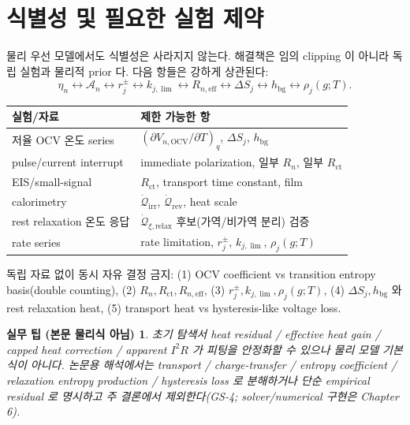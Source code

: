 \documentclass[11pt,a4paper]{article}
\newtheorem*{practicebox}{실무 팁 (본문 물리식 아님)}
\newcommand{\eff}{\mathrm{eff}}
\newcommand{\bg}{\mathrm{bg}}
\newcommand{\OCV}{\mathrm{OCV}}
\newcommand{\irr}{\mathrm{irr}}
\newcommand{\rev}{\mathrm{rev}}
\newcommand{\ct}{\mathrm{ct}}
\newcommand{\rlx}{\mathrm{relax}}
\begin{document}
\section{식별성 및 필요한 실험 제약}\label{sec:ch4_ident}
물리 우선 모델에서도 식별성은 사라지지 않는다. 해결책은 임의 clipping 이 아니라 독립 실험과 물리적 prior 다.
다음 항들은 강하게 상관된다:
\begin{equation}
\eta_n\leftrightarrow\mathcal A_n\leftrightarrow r_j^\pm\leftrightarrow k_{j,\lim}\leftrightarrow R_{n,\eff}\leftrightarrow\Delta S_j\leftrightarrow h_\bg\leftrightarrow\rho_j(g;T).
\label{eq:ch4_ident}
\end{equation}
\begin{longtable}{p{} >{\raggedright\arraybackslash}p{}}
\toprule 실험/자료 & 제한 가능한 항 \\ \midrule \endhead
저율 OCV 온도 series & $(\partial V_{n,\OCV}/\partial T)_q$, $\Delta S_j$, $h_\bg$ \\
pulse/current interrupt & immediate polarization, 일부 $R_n$, 일부 $R_\ct$ \\
EIS/small-signal & $R_\ct$, transport time constant, film \\
calorimetry & $\dot{\mathcal Q}_{\irr}$, $\dot{\mathcal Q}_{\rev}$, heat scale \\
rest relaxation 온도 응답 & $\dot{\mathcal Q}_{\xi,\rlx}$ 후보(가역/비가역 분리) 검증 \\
rate series & rate limitation, $r_j^\pm$, $k_{j,\lim}$, $\rho_j(g;T)$ \\
\bottomrule
\end{longtable}
독립 자료 없이 동시 자유 결정 금지: (1) OCV coefficient vs transition entropy basis(double counting),
(2) $R_n,R_\ct,R_{n,\eff}$, (3) $r_j^\pm,k_{j,\lim},\rho_j(g;T)$, (4) $\Delta S_j,h_\bg$ 와 rest relaxation
heat, (5) transport heat vs hysteresis-like voltage loss.
\begin{practicebox}
초기 탐색서 heat residual / effective heat gain / capped heat correction / apparent $I^2R$ 가 피팅을
안정화할 수 있으나 \emph{물리 모델 기본식이 아니다}. 논문용 해석에서는 transport / charge-transfer / entropy
coefficient / relaxation entropy production / hysteresis loss 로 분해하거나 단순 empirical residual 로 명시하고
주 결론에서 제외한다(GS-4; solver/numerical 구현은 Chapter 6).
\end{practicebox}
\end{document}
